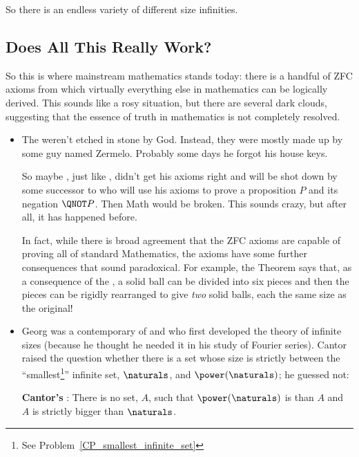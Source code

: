 So there is an endless variety of different size infinities.

\subsection{Does All This Really Work?}\label{setsreallywork}

So this is where mainstream mathematics stands today: there is a handful
of ZFC axioms from which virtually everything else in mathematics can be
logically derived.  This sounds like a rosy situation, but there are
several dark clouds, suggesting that the essence of truth in mathematics
is not completely resolved.

%
\begin{itemize}

\item The  weren't etched in stone by God.  Instead, they were
  mostly made up by some guy named Zermelo.  Probably some days he forgot
  his house keys.

  So maybe , just like , didn't get his axioms right and will
  be shot down by some successor to  who will use his axioms to
  prove a proposition $P$ and its negation $\QNOT P$.  Then Math would be
  broken.  This sounds crazy, but after all, it has happened before.

  In fact, while there is broad agreement that the ZFC axioms are capable
  of proving all of standard Mathematics, the axioms have some further
  consequences that sound paradoxical.  For example, the 
  Theorem says that, as a consequence of the , a solid ball
  can be divided into six pieces and then the pieces can be rigidly
  rearranged to give \emph{two} solid balls, each the same size as the
  original!

\item Georg  was a contemporary of  and
   who first developed the theory of infinite sizes (because
  he thought he needed it in his study of Fourier series).  Cantor raised
  the question whether there is a set whose size is strictly between the
  ``smallest\footnote{See Problem~\ref{CP_smallest_infinite_set}}''
  infinite set, $\naturals$, and $\power(\naturals)$; he guessed not:

  \textbf{Cantor's }: There is no set, $A$,
  such that $\power(\naturals)$ is  than $A$ and $A$
  is strictly bigger than $\naturals$.


\end{itemize}

